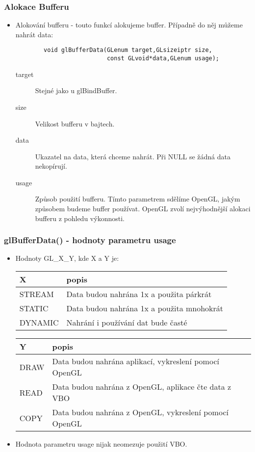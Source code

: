 \begin{frame}[fragile]
\frametitle{Alokace Bufferu}
	\begin{itemize}

		\item{ Alokování bufferu - touto funkcí alokujeme buffer. Případně do něj můžeme nahrát data:\\
		{\scriptsize
		\begin{verbatim}
		void glBufferData(GLenum target,GLsizeiptr size,
		                  const GLvoid*data,GLenum usage);
		\end{verbatim}
		}
		\begin{description}
			\item[target] Stejné jako u {\color{blue} glBindBuffer}.
			\item[size] Velikost bufferu v bajtech.
			\item[data] Ukazatel na data, která chceme nahrát.
			Při {\color{blue} NULL} se žádná data nekopírují.
			\item[usage] Způsob použití bufferu.
			Tímto parametrem sdělíme OpenGL, jakým způsobem budeme buffer používat.
			OpenGL zvolí nejvýhodnější alokaci bufferu z pohledu výkonnosti.
		\end{description}
		}

	\end{itemize}
\end{frame}

\begin{frame}
\frametitle{glBufferData() - hodnoty parametru usage}
	\begin{itemize}
		\item{Hodnoty GL\_X\_Y, kde X a Y je:}
		{\scriptsize
		\begin{tabular}{|l|l|}
		\hline
		X & popis \\ \hline
		STREAM & Data budou nahrána 1x a použita párkrát \\ \hline
		STATIC & Data budou nahrána 1x a použita mnohokrát \\ \hline
		DYNAMIC & Nahrání i používání dat bude časté \\ \hline
		\end{tabular}
		\begin{tabular}{|l|l|}
		\hline
		Y & popis \\ \hline
		DRAW & Data budou nahrána aplikací, vykreslení pomocí OpenGL \\ \hline
		READ & Data budou nahrána z OpenGL, aplikace čte data z VBO \\ \hline
		COPY & Data budou nahrána z OpenGL, vykreslení pomocí OpenGL \\ \hline
		\end{tabular}
		}
		\item{Hodnota parametru usage nijak neomezuje použití VBO.}
	\end{itemize}
\end{frame}

